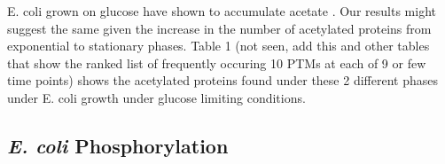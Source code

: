 \documentclass[12pt]{article}
\begin{document}
E. coli grown on glucose have shown to accumulate acetate \cite{Kuhnetal2014}. Our results might suggest the same given the increase in the number of acetylated proteins from exponential to stationary phases. Table 1 (not seen, add this and other tables that show the ranked list of frequently occuring 10 PTMs at each of 9 or few time points) shows the acetylated proteins found under these 2 different phases under E. coli growth under glucose limiting conditions.




\subsection{\emph{E. coli} Phosphorylation}
\end{document}
